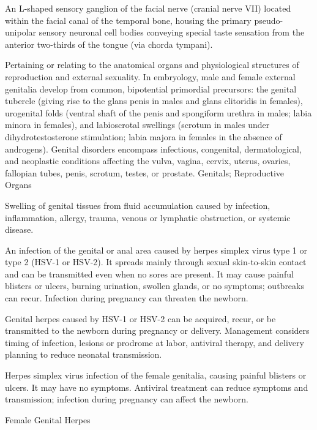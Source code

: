  An L-shaped sensory ganglion of the facial nerve (cranial nerve VII) located within the facial canal of the temporal bone, housing the primary pseudo-unipolar sensory neuronal cell bodies conveying special taste sensation from the anterior two-thirds of the tongue (via chorda tympani).

 Pertaining or relating to the anatomical organs and physiological structures of reproduction and external sexuality. In embryology, male and female external genitalia develop from common, bipotential primordial precursors: the genital tubercle (giving rise to the glans penis in males and glans clitoridis in females), urogenital folds (ventral shaft of the penis and spongiform urethra in males; labia minora in females), and labioscrotal swellings (scrotum in males under dihydrotestosterone stimulation; labia majora in females in the absence of androgens). Genital disorders encompass infectious, congenital, dermatological, and neoplastic conditions affecting the vulva, vagina, cervix, uterus, ovaries, fallopian tubes, penis, scrotum, testes, or prostate.
\synonyms
Genitals; Reproductive Organs

 Swelling of genital tissues from fluid accumulation caused by infection, inflammation, allergy, trauma, venous or lymphatic obstruction, or systemic disease.

 An infection of the genital or anal area caused by herpes simplex virus type 1 or type 2 (HSV-1 or HSV-2). It spreads mainly through sexual skin-to-skin contact and can be transmitted even when no sores are present. It may cause painful blisters or ulcers, burning urination, swollen glands, or no symptoms; outbreaks can recur. Infection during pregnancy can threaten the newborn.

 Genital herpes caused by HSV-1 or HSV-2 can be acquired, recur, or be transmitted to the newborn during pregnancy or delivery. Management considers timing of infection, lesions or prodrome at labor, antiviral therapy, and delivery planning to reduce neonatal transmission.

 Herpes simplex virus infection of the female genitalia, causing painful blisters or ulcers. It may have no symptoms. Antiviral treatment can reduce symptoms and transmission; infection during pregnancy can affect the newborn.

\synonyms
Female Genital Herpes

